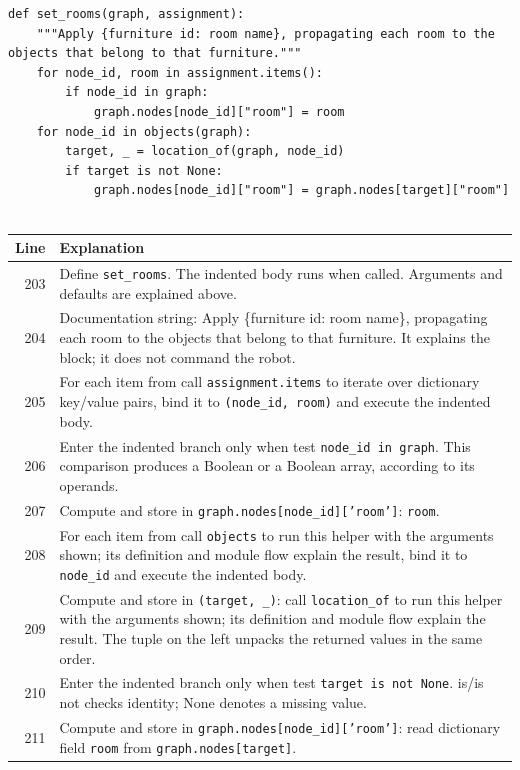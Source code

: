 \documentclass[11pt,a4paper]{book}
\begin{document}
\begin{lstlisting}[firstnumber=203]
def set_rooms(graph, assignment):
    """Apply {furniture id: room name}, propagating each room to the objects that belong to that furniture."""
    for node_id, room in assignment.items():
        if node_id in graph:
            graph.nodes[node_id]["room"] = room
    for node_id in objects(graph):
        target, _ = location_of(graph, node_id)
        if target is not None:
            graph.nodes[node_id]["room"] = graph.nodes[target]["room"]


\end{lstlisting}

\begin{longtable}{r p{}}

\textbf{Line} & \textbf{Explanation} \\ \hline \endhead

203 & Define \texttt{set\_rooms}. The indented body runs when called. Arguments and defaults are explained above. \\

204 & Documentation string: Apply \{furniture id: room name\}, propagating each room to the objects that belong to that furniture. It explains the block; it does not command the robot. \\

205 & For each item from call \texttt{assignment.items} to iterate over dictionary key/value pairs, bind it to \texttt{(node\_id, room)} and execute the indented body. \\

206 & Enter the indented branch only when test \texttt{node\_id in graph}. This comparison produces a Boolean or a Boolean array, according to its operands. \\

207 & Compute and store in \texttt{graph.nodes[node\_id]['room']}: \texttt{room}.  \\

208 & For each item from call \texttt{objects} to run this helper with the arguments shown; its definition and module flow explain the result, bind it to \texttt{node\_id} and execute the indented body. \\

209 & Compute and store in \texttt{(target, \_)}: call \texttt{location\_of} to run this helper with the arguments shown; its definition and module flow explain the result. The tuple on the left unpacks the returned values in the same order. \\

210 & Enter the indented branch only when test \texttt{target is not None}. is/is not checks identity; None denotes a missing value. \\

211 & Compute and store in \texttt{graph.nodes[node\_id]['room']}: read dictionary field \texttt{room} from \texttt{graph.nodes[target]}.  \\

\end{longtable}
\end{document}
